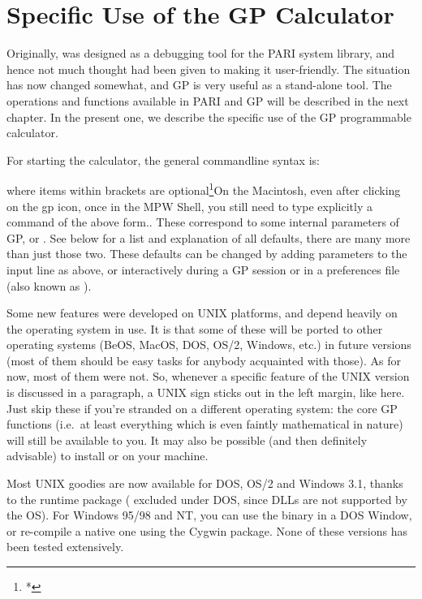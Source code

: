 \chapter{Specific Use of the GP Calculator}

Originally,  was designed as a debugging tool for the PARI system
library, and hence not much thought had been given to making it
user-friendly. The situation has now changed somewhat, and GP is very
useful as a stand-alone tool. The operations and functions available in
PARI and GP will be described in the next chapter. In the present one, we
describe the specific use of the GP programmable calculator.

For starting the calculator, the general commandline syntax is:


\noindent
where items within brackets are optional\footnote{*}{On the Macintosh, even
after clicking on the gp icon, once in the MPW Shell, you still need to type
explicitly a command of the above form.}. These correspond to some internal
parameters of GP, or . See  below for a
list and explanation of all defaults, there are many more than just those
two. These defaults can be changed by adding parameters to the input line
as above, or interactively during a GP session or in a preferences file (also
known as ).

\unix Some new features were developed on UNIX platforms, and depend heavily
on the operating system in use. It is  that some of these
will be ported to other operating systems (BeOS, MacOS, DOS, OS/2, Windows,
etc.) in future versions (most of them should be easy tasks for anybody
acquainted with those). As for now, most of them were not. So, whenever a
specific feature of the UNIX version is discussed in a paragraph, a UNIX sign
sticks out in the left margin, like here. Just skip these if you're stranded
on a different operating system: the core GP functions (i.e.~at least
everything which is even faintly mathematical in nature) will still be
available to you. It may also be possible (and then definitely advisable) to
install  or  on your machine.

 Most UNIX goodies are now
available for DOS, OS/2 and Windows 3.1, thanks to the  runtime
package ( excluded under DOS, since DLLs are not supported by
the OS). For Windows 95/98 and NT, you can use the  binary in a
DOS Window, or re-compile a native one using the Cygwin package. None of
these versions has been tested extensively.

